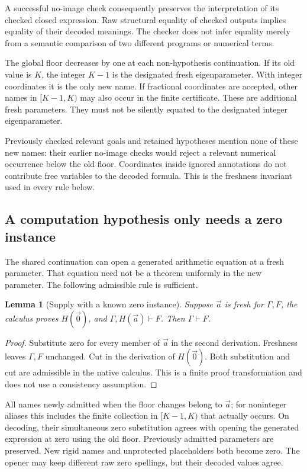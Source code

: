 \documentclass[11pt,letterpaper]{article}
\newtheorem{lemma}[theorem]{Lemma}
\theoremstyle{definition}\newtheorem{definition}[theorem]{Definition}
\theoremstyle{remark}\newtheorem{remark}[theorem]{Remark}
\begin{document}
A successful no-image check consequently preserves the interpretation
of its checked closed expression.  Raw structural equality of checked
outputs implies equality of their decoded meanings.  The checker does
not infer equality merely from a semantic comparison of two different
programs or numerical terms.

The global floor decreases by one at each non-hypothesis continuation.
If its old value is $K$, the integer $K-1$ is the designated fresh
eigenparameter.  With integer coordinates it is the only new name.
If fractional coordinates are accepted, other names in $[K-1,K)$ may
also occur in the finite certificate.  These are additional fresh
parameters.  They must not be silently equated to the designated
integer eigenparameter.

Previously checked relevant goals and retained hypotheses mention none
of these new names: their earlier no-image checks would reject a
relevant numerical occurrence below the old floor.  Coordinates inside
ignored annotations do not contribute free variables to the decoded
formula.  This is the freshness invariant used in every rule below.

\subsection{A computation hypothesis only needs a zero instance}
\label{subsec:zero-supply}

The shared continuation can open a generated arithmetic equation at a
fresh parameter.  That equation need not be a theorem uniformly in the
new parameter.  The following admissible rule is sufficient.

\begin{lemma}[Supply with a known zero instance]
\label{lem:zero-supply}
Suppose $\vec a$ is fresh for $\Gamma,F$, the calculus proves
$H(\vec0)$, and $\Gamma,H(\vec a)\vdash F$.  Then
$\Gamma\vdash F$.
\end{lemma}

\begin{proof}
Substitute zero for every member of $\vec a$ in the second derivation.
Freshness leaves $\Gamma,F$ unchanged.  Cut in the derivation of
$H(\vec0)$.  Both substitution and cut are admissible in the native
calculus.  This is a finite proof transformation and does not use a
consistency assumption.
\end{proof}

All names newly admitted when the floor changes belong to $\vec a$;
for noninteger aliases this includes the finite collection in
$[K-1,K)$ that actually occurs.  On decoding, their simultaneous zero
substitution agrees with opening the generated expression at zero using
the old floor.  Previously admitted parameters are preserved.  New
rigid names and unprotected placeholders both become zero.  The opener
may keep different raw zero spellings, but their decoded values agree.
\end{document}
